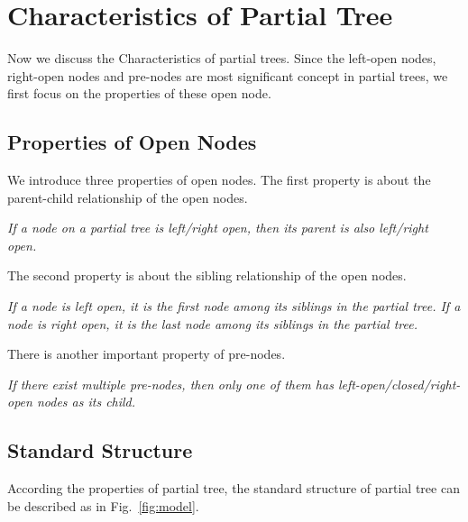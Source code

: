 
\section{Characteristics of Partial Tree}
\label{sec:chars}

Now we discuss the Characteristics of partial trees. Since the left-open nodes,
right-open nodes and pre-nodes are most significant concept in partial trees, we
first focus on the properties of these open node.

\subsection{Properties of Open Nodes}

We introduce three properties of open nodes. The first property is about the
parent-child relationship of the open nodes.

\begin{property}
\label{property1}\itshape
If a node on a partial tree is left/right open, then its parent is also
left/right open.
\end{property}

The second property is about the sibling relationship of the open nodes.

\begin{property}
\label{property2}\itshape
If a node is left open, it is the first node among its
siblings in the partial tree. If a node is right open, it is the last
node among its siblings in the partial tree.
\end{property}

There is another important property of pre-nodes.

\begin{property}
\label{property3}\itshape
If there exist multiple pre-nodes, then only one of
them has left-open/closed/right-open nodes as its child.
\end{property}


\subsection{Standard Structure}

According the properties of partial tree, the standard structure of partial tree
can be described as in Fig.~\ref{fig:model}.

